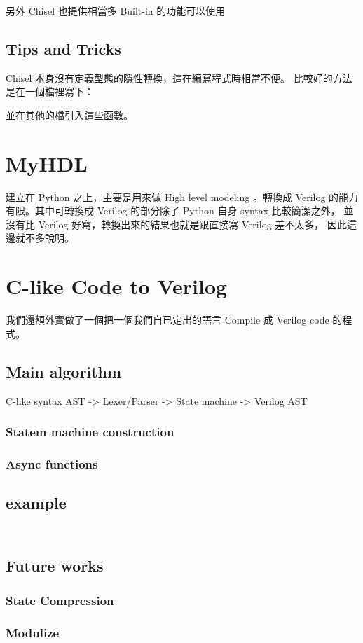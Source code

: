 \documentclass[12pt, a4paper]{article}
\begin{document}
另外 Chisel 也提供相當多 Built-in 的功能可以使用

\subsection{Tips and Tricks}
Chisel 本身沒有定義型態的隱性轉換，這在編寫程式時相當不便。
比較好的方法是在一個檔裡寫下：

並在其他的檔引入這些函數。

\section{MyHDL}
建立在 Python 之上，主要是用來做 High level modeling 。轉換成 Verilog
的能力有限。其中可轉換成 Verilog 的部分除了 Python 自身 syntax 比較簡潔之外，
並沒有比 Verilog 好寫，轉換出來的結果也就是跟直接寫 Verilog 差不太多，
因此這邊就不多說明。

\section{C-like Code to Verilog}
我們還額外實做了一個把一個我們自已定出的語言 Compile 成 Verilog code
的程式。

\subsection{Main algorithm}
C-like syntax AST -> Lexer/Parser -> State machine -> Verilog AST

\subsubsection{Statem machine construction}

\subsubsection{Async functions}

\subsection{example}
\inputminted{ver}{ref-codes/f.ver}

\inputminted{ver}{ref-codes/g.ver}

\subsection{Future works}
\subsubsection{State Compression}

\subsubsection{Modulize}
\end{document}

